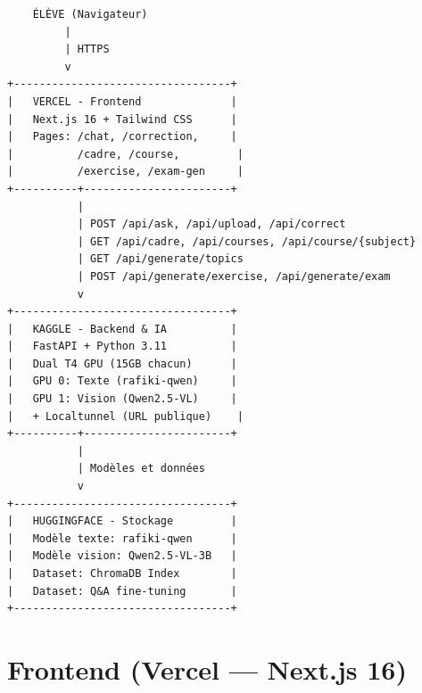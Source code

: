 \documentclass[12pt,a4paper]{report}
\begin{document}
\begin{verbatim}
    ÉLÈVE (Navigateur)                                              
         |                                                          
         | HTTPS                                                    
         v                                                          
+----------------------------------+                                
|   VERCEL - Frontend              |                                
|   Next.js 16 + Tailwind CSS      |                                
|   Pages: /chat, /correction,     |                                
|          /cadre, /course,         |                                
|          /exercise, /exam-gen     |                                
+----------+-----------------------+                                
           |                                                       
           | POST /api/ask, /api/upload, /api/correct              
           | GET /api/cadre, /api/courses, /api/course/{subject}   
           | GET /api/generate/topics                              
           | POST /api/generate/exercise, /api/generate/exam       
           v                                                       
+----------------------------------+                                
|   KAGGLE - Backend & IA          |                                
|   FastAPI + Python 3.11          |                                
|   Dual T4 GPU (15GB chacun)      |                                
|   GPU 0: Texte (rafiki-qwen)     |                                
|   GPU 1: Vision (Qwen2.5-VL)     |                                
|   + Localtunnel (URL publique)    |                                
+----------+-----------------------+                                
           |                                                       
           | Modèles et données                                    
           v                                                       
+----------------------------------+                                
|   HUGGINGFACE - Stockage         |                                
|   Modèle texte: rafiki-qwen      |                                
|   Modèle vision: Qwen2.5-VL-3B   |                                
|   Dataset: ChromaDB Index        |                                
|   Dataset: Q&A fine-tuning       |                                
+----------------------------------+                                
\end{verbatim}

\section{Frontend (Vercel — Next.js 16)}
\end{document}
